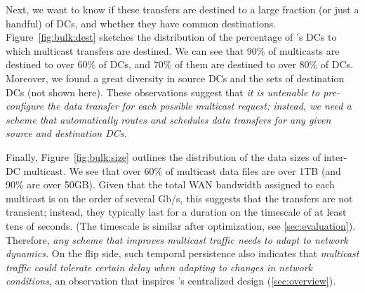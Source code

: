 \vspace{0.1cm}
Next, we want to know if these transfers are destined to
a large fraction (or just a handful) of DCs, and whether
they have common destinations.
Figure~\ref{fig:bulk:dest} sketches the distribution of the
percentage of \company's DCs to which multicast
transfers are destined.
We can see that 90\% of multicasts are destined
to over 60\% of DCs, and 70\% of them are destined
to over 80\% of DCs.
Moreover, we found a great diversity in
source DCs and the sets of destination DCs (not shown here).
These observations suggest that {\em it is untenable
to pre-configure the data transfer for each possible multicast
request; instead, we need a scheme that automatically routes and
schedules data transfers for any given source and destination
DCs.}


Finally, Figure~\ref{fig:bulk:size} outlines the distribution of
the data sizes of inter-DC multicast.
We see that over 60\% of multicast data files are over 1TB
(and 90\% are over 50GB).
Given that the total WAN bandwidth assigned to each multicast
is on the order of several Gb/s,
this suggests that the transfers are not transient; instead, they
typically last for a duration on the timescale of at least tens of
seconds. (The timescale is similar after optimization, see \Section\ref{sec:evaluation}).
Therefore, {\em any scheme that improves multicast traffic needs to
adapt to network dynamics.}
On the flip side, such temporal persistence
also indicates that {\em multicast traffic could tolerate certain delay
when adapting to changes in network conditions}, an observation
that inspires
\name's centralized design (\Section\ref{sec:overview}).


